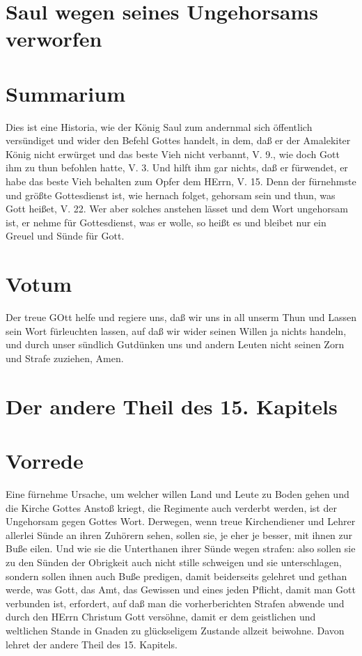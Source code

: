 \section{Saul wegen seines Ungehorsams verworfen}

\section{Summarium}

Dies ist eine Historia, wie der König Saul zum andernmal sich öffentlich versündiget und wider den Befehl Gottes handelt, in dem, daß er der Amalekiter König nicht erwürget und das beste Vieh nicht verbannt, V. 9., wie doch Gott ihm zu thun befohlen hatte, V. 3. Und hilft ihm gar nichts, daß er fürwendet, er habe das beste Vieh behalten zum Opfer dem HErrn, V. 15. Denn der fürnehmste und größte Gottesdienst ist, wie hernach folget, gehorsam sein und thun, was Gott heißet, V. 22. Wer aber solches anstehen lässet und dem Wort ungehorsam ist, er nehme für Gottesdienst, was er wolle, so heißt es und bleibet nur ein Greuel und Sünde für Gott.

\section{Votum}

Der treue GOtt helfe und regiere uns, daß wir uns in all unserm Thun und Lassen sein Wort fürleuchten lassen, auf daß wir wider seinen Willen ja nichts handeln, und durch unser sündlich Gutdünken uns und andern Leuten nicht seinen Zorn und Strafe zuziehen, Amen.

\section{Der andere Theil des 15. Kapitels}

\section{Vorrede}

Eine fürnehme Ursache, um welcher willen Land und Leute zu Boden gehen und die Kirche Gottes Anstoß kriegt, die Regimente auch verderbt werden, ist der Ungehorsam gegen Gottes Wort. Derwegen, wenn treue Kirchendiener und Lehrer allerlei Sünde an ihren Zuhörern sehen, sollen sie, je eher je besser, mit ihnen zur Buße eilen. Und wie sie die Unterthanen ihrer Sünde wegen strafen: also sollen sie zu den Sünden der Obrigkeit auch nicht stille schweigen und sie unterschlagen, sondern sollen ihnen auch Buße predigen, damit beiderseits gelehret und gethan werde, was Gott, das Amt, das Gewissen und eines jeden Pflicht, damit man Gott verbunden ist, erfordert, auf daß man die vorherberichten Strafen abwende und durch den HErrn Christum Gott versöhne, damit er dem geistlichen und weltlichen Stande in Gnaden zu glückseligem Zustande allzeit beiwohne. Davon lehret der andere Theil des 15. Kapitels.

